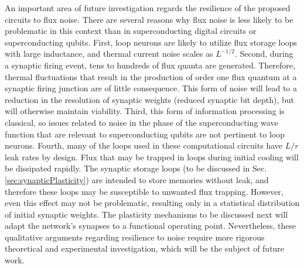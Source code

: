\documentclass[aip,amsmath,amssymb,reprint,nofootinbib]{revtex4-1}
\begin{document}
An important area of future investigation regards the resilience of the proposed circuits to flux noise. There are several reasons why flux noise is less likely to be problematic in this context than in superconducting digital circuits or superconducting qubits. First, loop neurons are likely to utilize flux storage loops with large inductance, and thermal current noise scales as $L^{-1/2}$. Second, during a synaptic firing event, tens to hundreds of flux quanta are generated. Therefore, thermal fluctuations that result in the production of order one flux quantum at a synaptic firing junction are of little consequence. This form of noise will lead to a reduction in the resolution of synaptic weights (reduced synaptic bit depth), but will otherwise maintain viability. Third, this form of information processing is classical, so issues related to noise in the phase of the superconducting wave function that are relevant to superconducting qubits are not pertinent to loop neurons. Fourth, many of the loops used in these computational circuits have $L/r$ leak rates by design. Flux that may be trapped in loops during initial cooling will be dissipated rapidly. The synaptic storage loops (to be discussed in Sec.\,\ref{sec:synapticPlasticity}) are intended to store memories without leak, and therefore these loops may be susceptible to unwanted flux trapping. However, even this effect may not be problematic, resulting only in a statistical distribution of initial synaptic weights. The plasticity mechanisms to be discussed next will adapt the network's synapses to a functional operating point. Nevertheless, these qualitative arguments regarding resilience to noise require more rigorous theoretical and experimental investigation, which will be the subject of future work.
\end{document}
